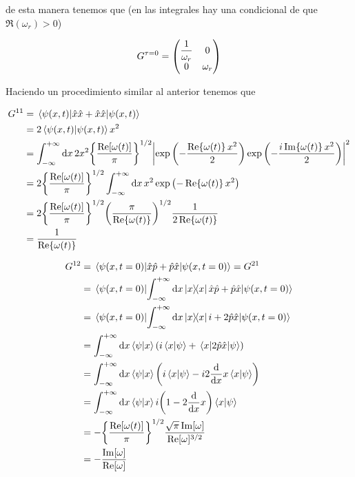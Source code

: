 \documentclass[../Main.tex]{subfiles}
\begin{document}
de esta manera tenemos que (en las integrales hay una condicional de que $\Re(\omega_r)>0$)

\begin{equation}
G^{\tau=0}=\mqty(\dfrac{1}{\omega_r} & 0 \\ 0 & \omega_r)
\end{equation}

Haciendo un procedimiento similar al anterior tenemos que 

\begin{equation}
\begin{split}
G^{11} & =\ev{\hat{x}\hat{x}+\hat{x}\hat{x}}{\psi(x,t)} \\
 & =2\ip{\psi(x,t)}x^2 \\
 & =\int_{-\infty}^{+\infty}\dd{x}2x^2\Bqty{\dfrac{\Re[\omega (t)]}{\pi}}^{1/2} \abs{\exp \pqty{- \frac{\Re{\omega (t)} \, x^2}{2}}\exp \pqty{- \frac{i\Im{\omega (t)} \, x^2}{2}}}^2 \\
 & =2\Bqty{\dfrac{\Re[\omega (t)]}{\pi}}^{1/2}\int_{-\infty}^{+\infty}\dd{x}x^2 \exp \pqty{- \Re{\omega (t)} \, x^2} \\
 & =2\Bqty{\dfrac{\Re[\omega (t)]}{\pi}}^{1/2} \pqty{\frac{\pi}{\Re{\omega (t)}}}^{1/2}\dfrac{1}{2\Re{\omega (t)}} \\
 & =\dfrac{1}{\Re{\omega (t)}}
\end{split}
\end{equation}

\begin{equation}
\begin{split}
G^{12} & =\ev{\hat{x}\hat{p}+\hat{p}\hat{x}}{\psi(x,t=0)} =G^{21} \\
& =\ev{\int_{-\infty}^{+\infty}\dd{x}\op{x}{x}\hat{x}\hat{p}+\hat{p}\hat{x}}{\psi(x,t=0)} \\
& =\ev{\int_{-\infty}^{+\infty}\dd{x}\op{x}{x}i+2\hat{p}\hat{x}}{\psi(x,t=0)} \\
& =\int_{-\infty}^{+\infty}\dd{x}\ip{\psi}{x}\qty(i\ip{x}{\psi}+\mel{x}{2\hat{p}\hat{x}}{\psi}) \\
& =\int_{-\infty}^{+\infty}\dd{x}\ip{\psi}{x}\qty(i\ip{x}{\psi}-i2\dv{x}x\ip{x}{\psi}) \\
& =\int_{-\infty}^{+\infty}\dd{x}\ip{\psi}{x}i\qty(1-2\dv{x}x)\ip{x}{\psi} \\
& =-\Bqty{\dfrac{\Re[\omega (t)]}{\pi}}^{1/2}\dfrac{ \sqrt{\pi } \Im[\omega]}{\Re[\omega]^{3/2}} \\
& =-\dfrac{   \Im[\omega]}{\Re[\omega]}
\end{split}
\end{equation}
\end{document}
